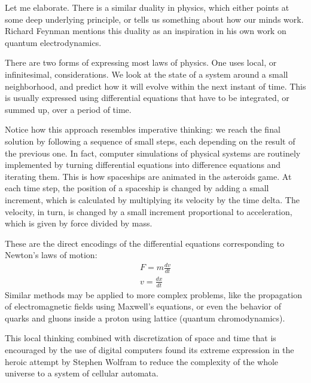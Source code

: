 Let me elaborate. There is a similar duality in physics, which either
points at some deep underlying principle, or tells us something about
how our minds work. Richard Feynman mentions this duality as an
inspiration in his own work on quantum electrodynamics.

There are two forms of expressing most laws of physics. One uses local,
or infinitesimal, considerations. We look at the state of a system
around a small neighborhood, and predict how it will evolve within the
next instant of time. This is usually expressed using differential
equations that have to be integrated, or summed up, over a period of
time.

Notice how this approach resembles imperative thinking: we reach the
final solution by following a sequence of small steps, each depending on
the result of the previous one. In fact, computer simulations of
physical systems are routinely implemented by turning differential
equations into difference equations and iterating them. This is how
spaceships are animated in the asteroids game. At each time step, the
position of a spaceship is changed by adding a small increment, which is
calculated by multiplying its velocity by the time delta. The velocity,
in turn, is changed by a small increment proportional to acceleration,
which is given by force divided by mass.

These are the direct encodings of the differential equations
corresponding to Newton's laws of motion:
\begin{align*}
F = m \frac{dv}{dt} \\
v = \frac{dx}{dt}
\end{align*}
Similar methods may be applied to more complex problems, like the
propagation of electromagnetic fields using Maxwell's equations, or even
the behavior of quarks and gluons inside a proton using lattice 
(quantum chromodynamics).

This local thinking combined with discretization of space and time that
is encouraged by the use of digital computers found its extreme
expression in the heroic attempt by Stephen Wolfram to reduce the
complexity of the whole universe to a system of cellular automata.

